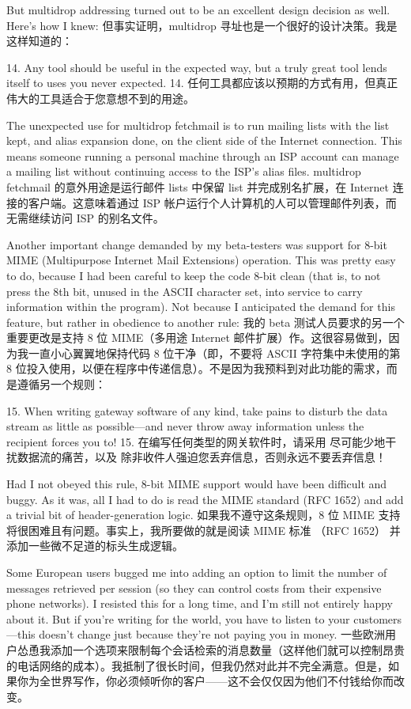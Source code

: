 \documentclass[a4paper,12pt,UTF8,twoside]{ctexbook}
\begin{document}
But multidrop addressing turned out to be an excellent design decision as well. Here's how I knew:
但事实证明，multidrop 寻址也是一个很好的设计决策。我是这样知道的：

14. Any tool should be useful in the expected way, but a truly great tool lends itself to uses you never expected.
14. 任何工具都应该以预期的方式有用，但真正伟大的工具适合于您意想不到的用途。

The unexpected use for multidrop fetchmail is to run mailing lists with the list kept, and alias expansion done, on the client side of the Internet connection. This means someone running a personal machine through an ISP account can manage a mailing list without continuing access to the ISP's alias files.
multidrop fetchmail 的意外用途是运行邮件 lists 中保留 list 并完成别名扩展，在 Internet 连接的客户端。这意味着通过 ISP 帐户运行个人计算机的人可以管理邮件列表，而无需继续访问 ISP 的别名文件。

Another important change demanded by my beta-testers was support for 8-bit MIME (Multipurpose Internet Mail Extensions) operation. This was pretty easy to do, because I had been careful to keep the code 8-bit clean (that is, to not press the 8th bit, unused in the ASCII character set, into service to carry information within the program). Not because I anticipated the demand for this feature, but rather in obedience to another rule:
我的 beta 测试人员要求的另一个重要更改是支持 8 位 MIME（多用途 Internet 邮件扩展）作。这很容易做到，因为我一直小心翼翼地保持代码 8 位干净（即，不要将 ASCII 字符集中未使用的第 8 位投入使用，以便在程序中传递信息）。不是因为我预料到对此功能的需求，而是遵循另一个规则：

15. When writing gateway software of any kind, take pains to disturb the data stream as little as possible—and never throw away information unless the recipient forces you to!
15. 在编写任何类型的网关软件时，请采用 尽可能少地干扰数据流的痛苦，以及 除非收件人强迫您丢弃信息，否则永远不要丢弃信息！

Had I not obeyed this rule, 8-bit MIME support would have been difficult and buggy. As it was, all I had to do is read the MIME standard (RFC 1652) and add a trivial bit of header-generation logic.
如果我不遵守这条规则，8 位 MIME 支持将很困难且有问题。事实上，我所要做的就是阅读 MIME 标准 （RFC 1652） 并添加一些微不足道的标头生成逻辑。

Some European users bugged me into adding an option to limit the number of messages retrieved per session (so they can control costs from their expensive phone networks). I resisted this for a long time, and I'm still not entirely happy about it. But if you're writing for the world, you have to listen to your customers—this doesn't change just because they're not paying you in money.
一些欧洲用户怂恿我添加一个选项来限制每个会话检索的消息数量（这样他们就可以控制昂贵的电话网络的成本）。我抵制了很长时间，但我仍然对此并不完全满意。但是，如果你为全世界写作，你必须倾听你的客户——这不会仅仅因为他们不付钱给你而改变。
\end{document}
